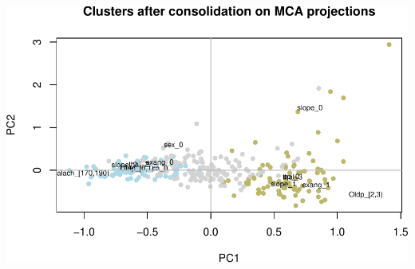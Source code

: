 \documentclass[]{article}
\begin{document}
\includegraphics{project_report_files/figure-latex/unnamed-chunk-28-1.pdf}
\end{document}
